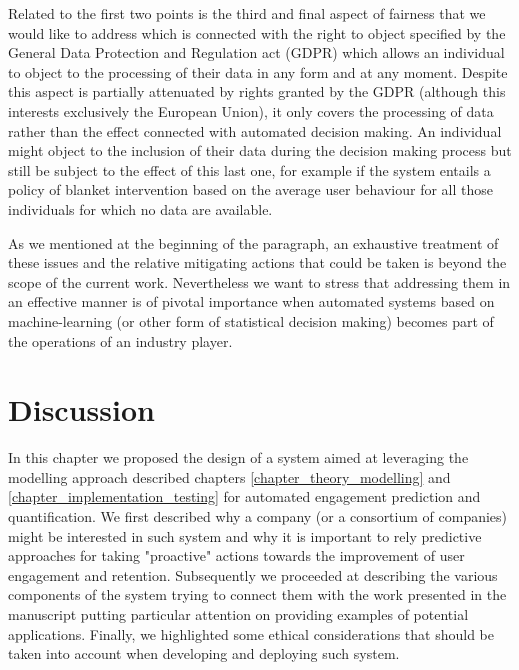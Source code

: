 Related to the first two points is the third and final aspect of fairness that we would like to address which is connected with the right to object specified by the General Data Protection and Regulation act (GDPR) \cite{EUdataregulations2018} which allows an individual to object to the processing of their data in any form and at any moment. Despite this aspect is partially attenuated by rights granted by the GDPR (although this interests exclusively the European Union), it only covers the processing of data rather than the effect connected with automated decision making. An individual might object to the inclusion of their data during the decision making process but still be subject to the effect of this last one, for example if the system entails a policy of blanket intervention based on the average user behaviour for all those individuals for which no data are available.

As we mentioned at the beginning of the paragraph, an exhaustive treatment of these issues and the relative mitigating actions that could be taken is beyond the scope of the current work. Nevertheless we want to stress that addressing them in an effective manner is of pivotal importance when automated systems based on machine-learning (or other form of statistical decision making) becomes part of the operations of an industry player.

\section{Discussion}
In this chapter we proposed the design of a system aimed at leveraging the modelling approach described chapters \ref{chapter_theory_modelling} and \ref{chapter_implementation_testing} for automated engagement prediction and quantification. We first described why a company (or a consortium of companies) might be interested in such system and why it is important to rely predictive approaches for taking "proactive" actions towards the improvement of user engagement and retention. Subsequently we proceeded at describing the various components of the system trying to connect them with the work presented in the manuscript putting particular attention on providing examples of potential applications. Finally, we highlighted some ethical considerations that should be taken into account when developing and deploying such system. 

